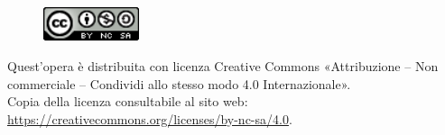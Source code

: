 \documentclass[a4paper,12pt]{report}
\begin{document}
\clearpage
\null

\vspace{\fill}
\begin{center}
\begin{figure}[h]
\begin{center}
\includegraphics[width=0.25\textwidth]{Images/License.png} 
\end{center}
\end{figure}
Quest’opera è distribuita con licenza Creative Commons «Attribuzione – Non
commerciale – Condividi allo stesso modo 4.0 Internazionale».\\
Copia della licenza consultabile al sito web:
\href{https://creativecommons.org/licenses/by-nc-sa/4.0}{https://creativecommons.org/licenses/by-nc-sa/4.0}.
\end{center}

\clearpage
\end{document}
